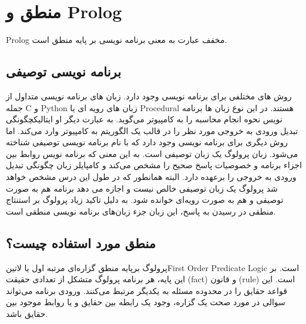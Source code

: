 \chapter{منطق و Prolog}
Prolog‌ مخفف عبارت 
 به معنی برنامه نویسی بر پایه منطق است. 
\clearpage
\section{برنامه نویسی توصیفی}
روش های مختلفی برای برنامه نویسی وجود دارد. زبان های برنامه نویسی متداول از جمله C و Python زبان های رویه ای یا Procedural هستند. در این نوع زبان ها برنامه نویس نحوه انجام محاسبه را به کامپیوتر می‌گوید. به عبارت دیگر او 
‌ایتالیک{چگونگی} تبدیل ورودی به خروجی مورد نظر را در قالب یک الگوریتم به کامپیوتر وارد می‌کند.
اما روش دیگری برای برنامه نویسی وجود دارد که با نام برنامه نویسی توصیفی شناخته می‌شود. زبان پرولوگ یک زبان توصیفی است. به این معنی که برنامه نویس روابط بین اجزاء برنامه و خصوصیات پاسخ صحیح را مشخص می‌کند و کامپایلر زبان چگونگی تبدیل ورودی به خروجی را برعهده دارد. البته همانطور که در طول این درس مشخص خواهد شد پرولوگ یک زبان توصیفی خالص نیست و اجازه می دهد برنامه هم به صورت توصیفی و هم به صورت رویه‌ای خوانده شود. به دلیل تاکید زیاد پرولوگ بر استنتاج منطقی در رسیدن به پاسخ، این زبان جزء زبان‌های برنامه نویسی منطقی است.

\section{منطق مورد استفاده چیست؟}
پرولوگ برپایه منطق گزاره‌ای مرتبه اول یا ‌لاتین{First Order Predicate Logic} است. بر این پایه، هر برنامه پرولوگ متشکل از تعدادی حقیقت (fact) و قانون (rule) است. این قواعد حقایق را در محدوده مسئله به یکدیگر مرتبط می‌کنند. ورودی برنامه می‌تواند سوالی در مورد صحت یک گزاره، وجود یک رابطه بین حقایق و یا روابط موجود بین حقایق باشد.



